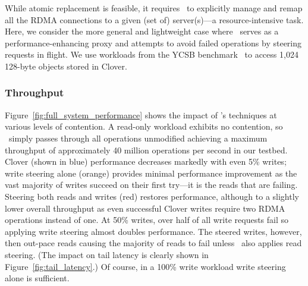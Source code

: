 While atomic replacement is feasible, it requires \sword\ to
explicitly manage and remap all the RDMA connections to a given (set
of) server(s)---a resource-intensive task.  Here, we consider the more
general and lightweight case where \sword\ serves as a
performance-enhancing proxy and attempts to avoid failed operations by
steering requests in flight.  We use workloads from the YCSB
benchmark~\cite{ycsb} to access 1,024 128-byte objects stored in Clover.

\subsubsection{Throughput}

Figure~\ref{fig:full_system_performance} shows the impact of \sword's
techniques at various levels of contention.  A read-only workload
exhibits no contention, so \sword\ simply passes through all
operations unmodified achieving a maximum throughput of approximately
40 million operations per second in our testbed.  Clover (shown in
blue) performance decreases markedly with even 5\% writes; write
steering alone (orange) provides minimal performance improvement as
the vast majority of writes succeed on their first try---it is the
reads that are failing.  Steering both reads and writes (red) restores
performance, although to a slightly lower overall throughput as even
successful Clover writes require two RDMA operations instead of one.
%
%
At 50\% writes, over half of all write requests fail so applying write
steering almost doubles performance.  The steered writes, however,
then out-pace reads causing the majority of reads to fail unless
\sword\ also applies read steering.  (The impact on tail latency is
clearly shown in Figure~\ref{fig:tail_latency}.)  Of course, in a
100\% write workload write steering alone is sufficient.
%
%



